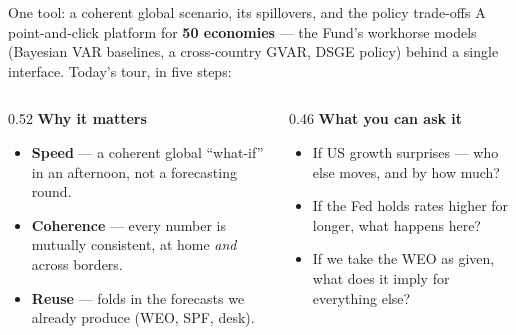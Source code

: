 \documentclass[aspectratio=169,10pt]{beamer}
\newcommand{\key}[1]{\textbf{\textcolor{MadridBlue}{#1}}}
\newcommand{\plus}{\item[\textcolor{CheckGreen}{\textbf{+}}]}
\begin{document}
\begin{frame}{One tool: a coherent global scenario, its spillovers, and the policy trade-offs}
\vspace{0.2em}
{\small A point-and-click platform for \key{50 economies} --- the Fund's workhorse models (Bayesian VAR baselines, a cross-country GVAR, DSGE policy) behind a single interface. Today's tour, in five steps:}
\vspace{0.35em}
\begin{center}
\end{center}
\vspace{0.1em}
\begin{columns}[T,onlytextwidth]
\begin{column}{0.52\textwidth}
  {\small\bfseries\color{MadridBlue} Why it matters}
  \begin{itemize}\setlength\itemsep{2pt}\small
    \plus \key{Speed} --- a coherent global ``what-if'' in an afternoon, not a forecasting round.
    \plus \key{Coherence} --- every number is mutually consistent, at home \emph{and} across borders.
    \plus \key{Reuse} --- folds in the forecasts we already produce (WEO, SPF, desk).
  \end{itemize}
\end{column}
\begin{column}{0.46\textwidth}
  {\small\bfseries\color{MadridBlue} What you can ask it}
  \begin{itemize}\setlength\itemsep{2pt}\small
    \item If US growth surprises --- who else moves, and by how much?
    \item If the Fed holds rates higher for longer, what happens here?
    \item If we take the WEO as given, what does it imply for everything else?
  \end{itemize}
\end{column}
\end{columns}
\end{frame}
\end{document}
